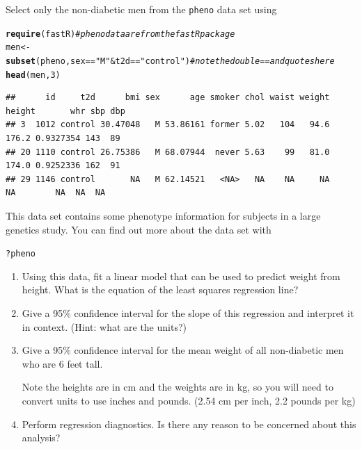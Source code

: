 \documentclass[twoside]{book}
\makeatletter
\newcommand{\hlnum}[1]{\textcolor[rgb]{0.686,0.059,0.569}{#1}}%
\newcommand{\hlstr}[1]{\textcolor[rgb]{0.192,0.494,0.8}{#1}}%
\newcommand{\hlcom}[1]{\textcolor[rgb]{0.678,0.584,0.686}{\textit{#1}}}%
\newcommand{\hlopt}[1]{\textcolor[rgb]{0,0,0}{#1}}%
\newcommand{\hlstd}[1]{\textcolor[rgb]{0.345,0.345,0.345}{#1}}%
\newcommand{\hlkwb}[1]{\textcolor[rgb]{0.69,0.353,0.396}{#1}}%
\newcommand{\hlkwd}[1]{\textcolor[rgb]{0.737,0.353,0.396}{\textbf{#1}}}%
\newenvironment{kframe}{%
 \def\at@end@of@kframe{}%
 \ifinner\ifhmode%
  \def\at@end@of@kframe{\end{minipage}}%
  \begin{minipage}{\columnwidth}%
 \fi\fi%
 \def\FrameCommand##1{\hskip\@totalleftmargin \hskip-\fboxsep
 \colorbox{shadecolor}{##1}\hskip-\fboxsep
     \hskip-\linewidth \hskip-\@totalleftmargin \hskip\columnwidth}%
 \MakeFramed {\advance\hsize-\width
   \@totalleftmargin\z@ \linewidth\hsize
   \@setminipage}}%
 {\par\unskip\endMakeFramed%
 \at@end@of@kframe}
\newenvironment{knitrout}{}{} %
\newcommand{\Rindex}[1]{\index{\texttt{#1}}}
\newcommand{\dataframe}[1]{{\color{blue!80!black}\texttt{#1}}\Rindex{#1}}
\makeatother
\begin{document}
\begin{problem}
	Select only the non-diabetic men from the \dataframe{pheno} data set using
\begin{knitrout}
\color{fgcolor}\begin{kframe}
\begin{alltt}
\hlkwd{require}\hlstd{(fastR)}  \hlcom{#pheno data are from the fastR package}
\hlstd{men} \hlkwb{<-} \hlkwd{subset}\hlstd{(pheno, sex} \hlopt{==} \hlstr{"M"} \hlopt{&} \hlstd{t2d} \hlopt{==} \hlstr{"control"}\hlstd{)}  \hlcom{# note the double == and quotes here}
\hlkwd{head}\hlstd{(men,} \hlnum{3}\hlstd{)}
\end{alltt}
\begin{verbatim}
##      id     t2d      bmi sex      age smoker chol waist weight height       whr sbp dbp
## 3  1012 control 30.47048   M 53.86161 former 5.02   104   94.6  176.2 0.9327354 143  89
## 20 1110 control 26.75386   M 68.07944  never 5.63    99   81.0  174.0 0.9252336 162  91
## 29 1146 control       NA   M 62.14521   <NA>   NA    NA     NA     NA        NA  NA  NA
\end{verbatim}
\end{kframe}
\end{knitrout}
This data set contains some phenotype information for subjects in
a large genetics study.  You can find out more about the data set with
\begin{knitrout}
\color{fgcolor}\begin{kframe}
\begin{alltt}
\hlopt{?}\hlstd{pheno}
\end{alltt}
\end{kframe}
\end{knitrout}
\begin{enumerate}
	\item
		Using this data, fit a linear model that can be used 
		to predict weight from height.  What is the equation 
		of the least squares regression line?
	\item
		Give a 95\% confidence interval for the slope of this regression
		and interpret it in context.  (Hint: what are the units?)
	\item
		Give a 95\% confidence interval for the mean weight of all 
		non-diabetic men who are 6 feet tall.  
		
		Note the heights are in cm and the weights are in kg, so you will need to convert 
		units to use inches and pounds.  (2.54 cm per inch, 2.2 pounds per kg)
	\item
		Perform regression diagnostics.  Is there any reason to be concerned
		about this analysis?
\end{enumerate}

\end{problem}
\end{document}
